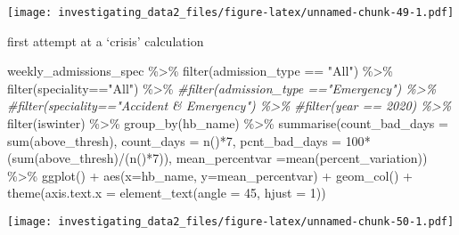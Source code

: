 \documentclass[
]{article}
\newenvironment{Shaded}{\begin{snugshade}}{\end{snugshade}}
\newcommand{\AttributeTok}[1]{\textcolor[rgb]{0.77,0.63,0.00}{#1}}
\newcommand{\CommentTok}[1]{\textcolor[rgb]{0.56,0.35,0.01}{\textit{#1}}}
\newcommand{\DecValTok}[1]{\textcolor[rgb]{0.00,0.00,0.81}{#1}}
\newcommand{\FunctionTok}[1]{\textcolor[rgb]{0.00,0.00,0.00}{#1}}
\newcommand{\NormalTok}[1]{#1}
\newcommand{\SpecialCharTok}[1]{\textcolor[rgb]{0.00,0.00,0.00}{#1}}
\newcommand{\StringTok}[1]{\textcolor[rgb]{0.31,0.60,0.02}{#1}}
\begin{document}
\texttt{[image: investigating\_data2\_files/figure-latex/unnamed-chunk-49-1.pdf]}

first attempt at a `crisis' calculation

\begin{Shaded}
\begin{Highlighting}[]
\NormalTok{weekly\_admissions\_spec }\SpecialCharTok{\%\textgreater{}\%} 
  \FunctionTok{filter}\NormalTok{(admission\_type }\SpecialCharTok{==} \StringTok{"All"}\NormalTok{) }\SpecialCharTok{\%\textgreater{}\%} 
  \FunctionTok{filter}\NormalTok{(speciality}\SpecialCharTok{==}\StringTok{"All"}\NormalTok{) }\SpecialCharTok{\%\textgreater{}\%} 
  \CommentTok{\#filter(admission\_type =="Emergency") \%\textgreater{}\% }
  \CommentTok{\#filter(speciality=="Accident \& Emergency") \%\textgreater{}\% }
  \CommentTok{\#filter(year == 2020) \%\textgreater{}\% }
  \FunctionTok{filter}\NormalTok{(iswinter) }\SpecialCharTok{\%\textgreater{}\%}
  \FunctionTok{group\_by}\NormalTok{(hb\_name) }\SpecialCharTok{\%\textgreater{}\%} 
  \FunctionTok{summarise}\NormalTok{(}\AttributeTok{count\_bad\_days =} \FunctionTok{sum}\NormalTok{(above\_thresh), }
            \AttributeTok{count\_days =} \FunctionTok{n}\NormalTok{()}\SpecialCharTok{*}\DecValTok{7}\NormalTok{, }
            \AttributeTok{pcnt\_bad\_days =} \DecValTok{100}\SpecialCharTok{*}\NormalTok{(}\FunctionTok{sum}\NormalTok{(above\_thresh)}\SpecialCharTok{/}\NormalTok{(}\FunctionTok{n}\NormalTok{()}\SpecialCharTok{*}\DecValTok{7}\NormalTok{)), }
            \AttributeTok{mean\_percentvar =}\FunctionTok{mean}\NormalTok{(percent\_variation)) }\SpecialCharTok{\%\textgreater{}\%}
  \FunctionTok{ggplot}\NormalTok{() }\SpecialCharTok{+}
  \FunctionTok{aes}\NormalTok{(}\AttributeTok{x=}\NormalTok{hb\_name, }\AttributeTok{y=}\NormalTok{mean\_percentvar) }\SpecialCharTok{+}
  \FunctionTok{geom\_col}\NormalTok{() }\SpecialCharTok{+}
  \FunctionTok{theme}\NormalTok{(}\AttributeTok{axis.text.x =} \FunctionTok{element\_text}\NormalTok{(}\AttributeTok{angle =} \DecValTok{45}\NormalTok{, }\AttributeTok{hjust =} \DecValTok{1}\NormalTok{))}
\end{Highlighting}
\end{Shaded}

\texttt{[image: investigating\_data2\_files/figure-latex/unnamed-chunk-50-1.pdf]}
\end{document}
